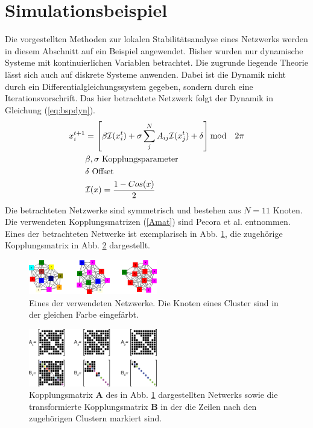 \section{Simulationsbeispiel}
Die vorgestellten Methoden zur lokalen Stabilitätsanalyse eines Netzwerks werden in diesem Abschnitt auf ein Beispiel angewendet. Bisher wurden nur dynamische Systeme mit kontinuierlichen Variablen betrachtet. Die zugrunde liegende Theorie lässt sich auch auf diskrete Systeme anwenden. Dabei ist die Dynamik nicht durch ein Differentialgleichungssystem gegeben, sondern durch eine Iterationsvorschrift. Das hier betrachtete Netzwerk \cite{pecora2014} folgt der Dynamik in Gleichung (\ref{eq:bspdyn}).
\begin{align}
\label{eq:bspdyn}
	x_i^{t+1}&=\left[\beta\mathcal{I}(x_i^t)+\sigma \sum_j^N A_{ij}\mathcal{I}(x_j^t)+\delta\right] \text{mod}\quad 2\pi
	\\\notag & \beta,\sigma \text{ Kopplungsparameter}
	\\\notag  & \delta \text{ Offset}
	\\\notag &\mathcal{I}(x)=\frac{1-Cos(x)}{2}
\end{align}
Die betrachteten Netzwerke sind symmetrisch und bestehen aus $N=11$ Knoten. Die verwendeten Kopplungsmatrizen (\ref{Amat}) sind Pecora et al. \cite{pecora2014} entnommen. Eines der betrachteten Netwerke ist exemplarisch in Abb. \ref{fig:cluster}, die zugehörige Kopplungsmatrix in Abb. \ref{fig:abmat} dargestellt. 
\begin{figure}
	 \centering
	 \includegraphics[width=0.5\textwidth]{abb/misc/cluster.png}
	 \caption{Eines der verwendeten Netzwerke. Die Knoten eines Cluster sind in der gleichen Farbe eingefärbt.}
	 \label{fig:cluster}
\end{figure}

\begin{figure}
	\centering
	\includegraphics[width=0.5\textwidth]{abb/misc/ABMat.png}
	\caption{Kopplungsmatrix $\boldsymbol{A}$ des in Abb. \ref{fig:cluster} dargestellten Netwerks sowie die transformierte Kopplungsmatrix $\boldsymbol{B}$ in der die Zeilen nach den zugehörigen Clustern markiert sind\cite{pecora2014}.}
\label{fig:abmat}
\end{figure}

